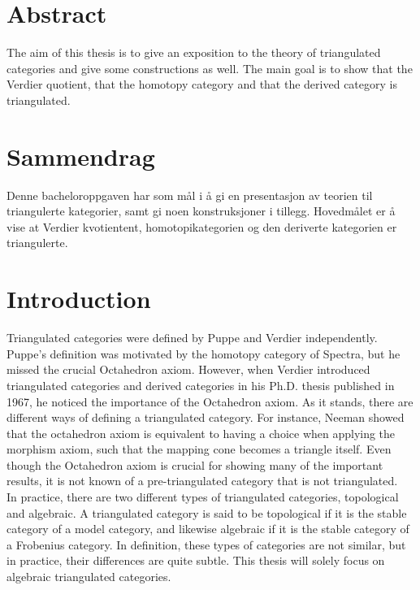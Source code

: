 \chapter*{Abstract}
    The aim of this thesis is to give an exposition to the theory of triangulated categories and give some constructions as well. The main goal is to show that the Verdier quotient, that the homotopy category and that the derived category is triangulated.

\chapter*{Sammendrag}
    Denne bacheloroppgaven har som mål i å gi en presentasjon av teorien til triangulerte kategorier, samt gi noen konstruksjoner i tillegg. Hovedmålet er å vise at Verdier kvotientent, homotopikategorien og den deriverte kategorien er triangulerte.

\chapter*{Introduction}

    Triangulated categories were defined by Puppe and Verdier independently. Puppe's definition was motivated by the homotopy category of Spectra, but he missed the crucial Octahedron axiom. However, when Verdier introduced triangulated categories and derived categories in his Ph.D. thesis published in 1967, he noticed the importance of the Octahedron axiom. As it stands, there are different ways of defining a triangulated category. For instance, Neeman showed that the octahedron axiom is equivalent to having a choice when applying the morphism axiom, such that the mapping cone becomes a triangle itself. Even though the Octahedron axiom is crucial for showing many of the important results, it is not known of a pre-triangulated category that is not triangulated. \\
    
    In practice, there are two different types of triangulated categories, topological and algebraic. A triangulated category is said to be topological if it is the stable category of a model category, and likewise algebraic if it is the stable category of a Frobenius category. In definition, these types of categories are not similar, but in practice, their differences are quite subtle. This thesis will solely focus on algebraic triangulated categories. \\

